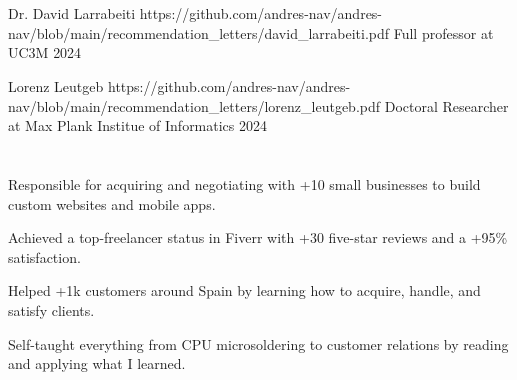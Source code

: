 \documentclass[]{cv}
\begin{document}
\sectionsep%

%

\section{}
\runsubsection%
{\dumblang%
	{Dr. David Larrabeiti}
	{}
}
{https://github.com/andres-nav/andres-nav/blob/main/recommendation_letters/david_larrabeiti.pdf}
{Full professor at UC3M}
{2024}

\runsubsection%
{\dumblang%
	{Lorenz Leutgeb}
	{}
}
{https://github.com/andres-nav/andres-nav/blob/main/recommendation_letters/lorenz_leutgeb.pdf}
{Doctoral Researcher at Max Plank Institue of Informatics}
{2024}


\section{}

\begin{tightemize}
	\item \dumblang%
	{Responsible for acquiring and negotiating with +10 small businesses to build custom websites and mobile apps.}
	{}
	\item \dumblang%
	{Achieved a top-freelancer status in Fiverr with +30 five-star reviews and a +95\% satisfaction.}
	{}
\end{tightemize}

\begin{tightemize}
	\item \dumblang%
	{Helped +1k customers around Spain by learning how to acquire, handle, and satisfy clients.}
	{}
	\item \dumblang%
	{Self-taught everything from CPU microsoldering to customer relations by reading and applying what I learned.}
	{}
\end{tightemize}


\end{document}
